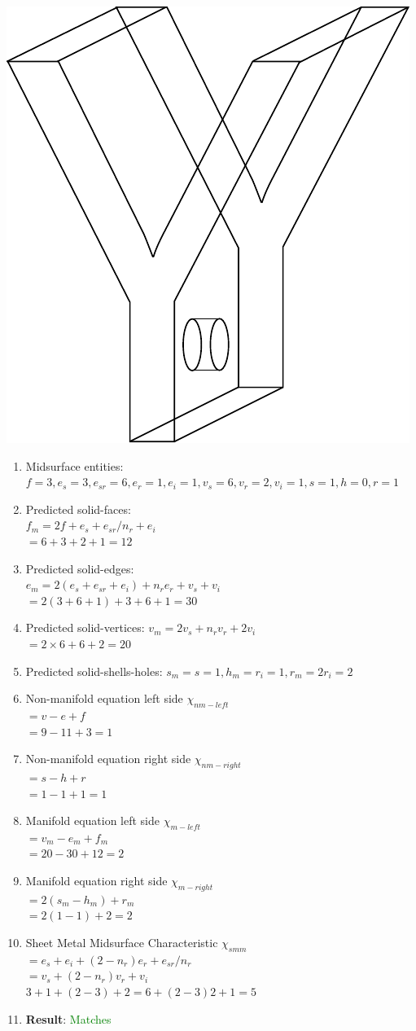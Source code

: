 \begin{enumerate}
\begin{center}
\includegraphics[width=0.3\linewidth]{../Common/images/YwithHole.pdf} 
\end{center}

\begin{enumerate}
\item Midsurface entities: \\ $f = 3, e_s = 3, e_{sr} = 6, e_r = 1, e_i=1,v_s = 6,v_r =2, v_i= 1, s=1,h=0,r=1$
\item Predicted solid-faces: \\ $f_m = 2f+e_s+e_{sr}/n_{r} +e_i  $\\$= 6+3+2+1=12$
\item Predicted solid-edges: \\$e_m = 2(e_s+e_{sr}+e_i )+n_{r} e_{r}+v_s+v_i $\\$= 2(3+6+1)+3+6+1 =30$
\item Predicted solid-vertices:  $v_m = 2v_s+n_{r} v_r+2v_i $\\$=2\times6+ 6 + 2=20$
\item Predicted solid-shells-holes: $s_m =s = 1,h_m = r_i  = 1, r_m = 2r_i = 2$
\item Non-manifold equation left side  $\chi_{nm-left}$\\$= v-e+f $\\$= 9-11+3=1$
\item Non-manifold equation right side  $\chi_{nm-right}$\\$=s-h+r$\\$=1-1+1 = 1$
\item Manifold equation left side  $\chi_{m-left}$\\$= v_m-e_m+f_m$\\$=20-30+12 = 2$
\item Manifold equation right side  $\chi_{m-right} $\\$=2(s_m-h_m )+r_m$\\$= 2(1-1)+2 = 2$
\item Sheet Metal Midsurface Characteristic $\chi_{smm}$ \\$=
e_s+e_i+(2-n_{r} ) e_{r}+e_{sr}/n_{r} $\\$=v_s+(2-n_{r} ) v_{r}+v_i$\\$ 3+1+(2-3)+2=6+(2-3)2+1=5$
\item \textbf{Result}: \textcolor{green}{Matches}
\end{enumerate}


\end{enumerate}
